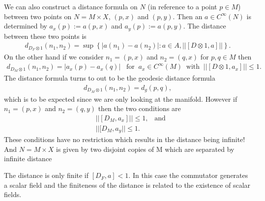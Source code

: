 We can also construct a distance formula on $N$ (in reference to a point $p
\in M$) between two points on $N=M\times X$, $(p, x)$ and $(p,y)$. Then an $a
\in C^\infty(N)$ is determined by $a_x(p):=a(p, x)$ and $a_y(p):=a(p, y)$.
The distance between these two points is
\begin{align}
    d_{D_F\otimes 1}(n_1, n_2) =  \sup \left\{ |a(n_1) - a(n_2)|: a\in
    A, ||[D\otimes 1, a]||\right\}.
\end{align}
On the other hand if we consider $n_1 = (p,x)$ and $n_2 = (q, x)$
for $p,q \in M$ then
\begin{align}
    d_{D_M \otimes 1} (n_1, n_2) = |a_x(p) - a_x(q)| \;\;\;\text{for}\;\;
    a_x\in
    C^\infty(M) \;\; \text{with} \;\; ||[D\otimes 1, a_x]|| \leq 1.
\end{align}
The distance formula turns to out to be the geodesic distance formula
\begin{align}
    d_{D_M\otimes1}(n_1, n_2) = d_g(p, q),
\end{align}
which is to be expected since we are only looking at the manifold.
However if $n_1 = (p, x)$ and $n_2 = (q, y)$ then the two conditions are
\begin{align}
    &||[D_M, a_x]|| \leq 1, \;\;\; \text{and}\\
    &||[D_M, a_y|| \leq 1.
\end{align}
These conditions have no restriction which results in the distance being
infinite! And $N = M\times X$ is given by two disjoint copies of M  which are
separated by infinite distance

The distance is only finite if $[D_F, a] < 1$. In this case the commutator
generates a scalar field and the finiteness of the distance is
related to the existence of scalar fields.

